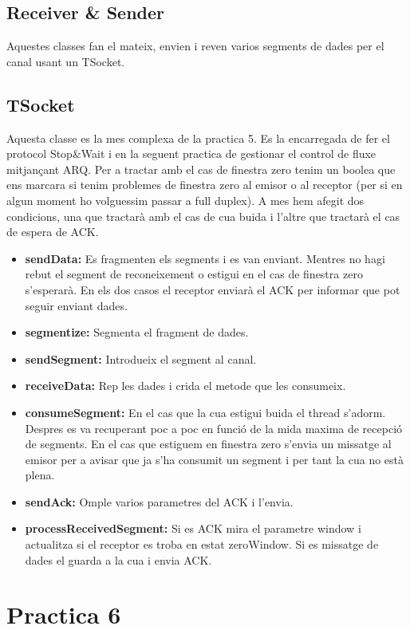\documentclass[12pt, a4papre]{article}
\begin{document}
	\subsection{Receiver \& Sender}
	
	Aquestes classes fan el mateix, envien i reven varios segments de dades per el canal usant un TSocket. 
	
	\subsection{TSocket}
	
	Aquesta classe es la mes complexa de la practica 5. Es la encarregada de fer el protocol Stop\&Wait i en la seguent practica de gestionar el control de fluxe mitjançant ARQ. Per a tractar amb el cas de finestra zero tenim un boolea que ens marcara si tenim problemes de finestra zero al emisor o al receptor (per si en algun moment ho volguessim passar a full duplex). A mes hem afegit dos condicions, una que tractarà amb el cas de cua buida i l'altre que tractarà el cas de espera de ACK.
	
	\begin{itemize}
		\item \textbf{sendData:} Es fragmenten els segments i es van enviant. Mentres no hagi rebut el segment de reconeixement o estigui en el cas de finestra zero s'esperarà. En els dos casos el receptor enviarà el ACK per informar que pot seguir enviant dades.
		\item \textbf{segmentize:} Segmenta el fragment de dades.
		\item \textbf{sendSegment:} Introdueix el segment al canal.
		\item \textbf{receiveData:} Rep les dades i crida el metode que les consumeix.
		\item \textbf{consumeSegment:} En el cas que la cua estigui buida el thread s'adorm. Despres es va recuperant poc a poc en funció de la mida maxima de recepció de segments. En el cas que estiguem en finestra zero s'envia un missatge al emisor per a avisar que ja s'ha consumit un segment i per tant la cua no està plena.
		\item \textbf{sendAck:} Omple varios parametres del ACK i l'envia.
		\item \textbf{processReceivedSegment:} Si es ACK mira el parametre window i actualitza si el receptor es troba en estat zeroWindow. Si es missatge de dades el guarda a la cua i envia ACK.
	\end{itemize}
	\newpage
	\section{Practica 6}
	
\end{document}
